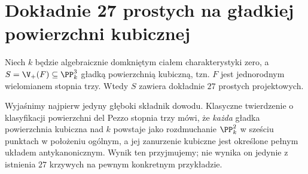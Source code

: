 \section{Dokładnie 27 prostych na gładkiej powierzchni kubicznej}
\label{sec:ga6-27}

\begin{twierdzenie}
\label{tw:ga6-27-lines}
Niech $k$ będzie algebraicznie domkniętym ciałem
charakterystyki zero, a
$S=\V_+(F)\subseteq\PP^3_k$ gładką powierzchnią
kubiczną, tzn. $F$ jest jednorodnym wielomianem
stopnia trzy. Wtedy $S$ zawiera dokładnie
$27$ prostych projektowych.
\end{twierdzenie}

Wyjaśnimy najpierw jedyny głęboki składnik dowodu.
Klasyczne twierdzenie o klasyfikacji powierzchni
del Pezzo stopnia trzy mówi, że \emph{każda} gładka
powierzchnia kubiczna nad $k$ powstaje jako
rozdmuchanie $\PP^2_k$ w sześciu punktach w położeniu
ogólnym, a jej zanurzenie kubiczne jest określone
pełnym układem antykanonicznym. Wynik ten przyjmujemy;
nie wynika on jedynie z istnienia $27$ krzywych
na pewnym konkretnym przykładzie.

